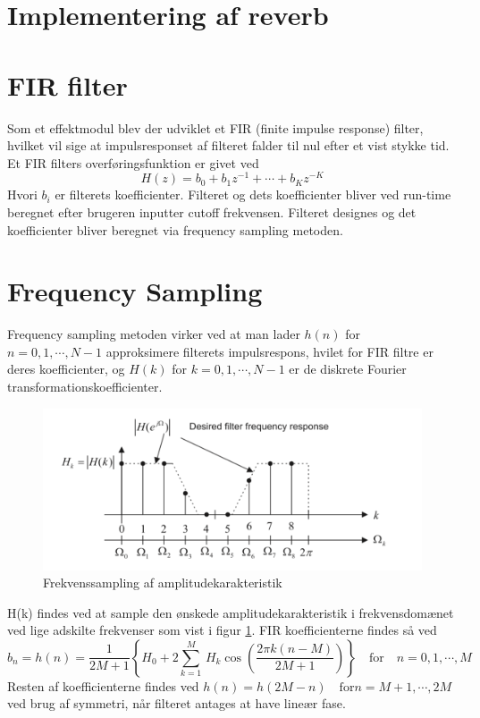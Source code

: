 \section{Implementering af reverb}

\section{FIR filter}
Som et effektmodul blev der udviklet et FIR (finite impulse response) filter, hvilket vil sige at impulsresponset af filteret falder til nul efter et vist stykke tid.\newline
Et FIR filters overføringsfunktion er givet ved
\begin{equation}
H(z) = b_0 + b_1z^{-1} + \cdots + b_Kz^{-K}
\end{equation}
Hvori $b_i$ er filterets koefficienter.\cite[p.218]{Tan2013}\newline
Filteret og dets koefficienter bliver ved run-time beregnet efter brugeren inputter cutoff frekvensen. Filteret designes og det koefficienter bliver beregnet via frequency sampling metoden.
\section{Frequency Sampling}
Frequency sampling metoden virker ved at man lader $h(n)$ for $n = 0, 1, \cdots, N - 1$ approksimere filterets impulsrespons, hvilet for FIR filtre er deres koefficienter, og $H(k)$ for $k = 0, 1, \cdots, N - 1$ er de diskrete Fourier transformationskoefficienter.
\begin{figure}[!ht]
	\includegraphics[width=\textwidth]{billeder/frequencysampling.png}
	\caption{Frekvenssampling af amplitudekarakteristik}
	\label{fig:frequencysampling}
\end{figure}
H(k) findes ved at sample den ønskede amplitudekarakteristik i frekvensdomænet ved lige adskilte frekvenser som vist i figur \ref{fig:frequencysampling}.
FIR koefficienterne findes så ved
\begin{equation}
b_n = h(n) = \frac{1}{2M + 1} \left\{H_0 + 2\displaystyle\sum_{k = 1}^{M}\, H_k\cos\left(\frac{2\pi k (n - M)}{2M + 1} \right) \right\} \quad \mathrm{for} \quad n = 0, 1, \cdots, M
\end{equation}
Resten af koefficienterne findes ved $h(n) = h(2M - n) \quad \mathrm{for} n = M + 1, \cdots, 2M$ ved brug af symmetri, når filteret antages at have lineær fase.